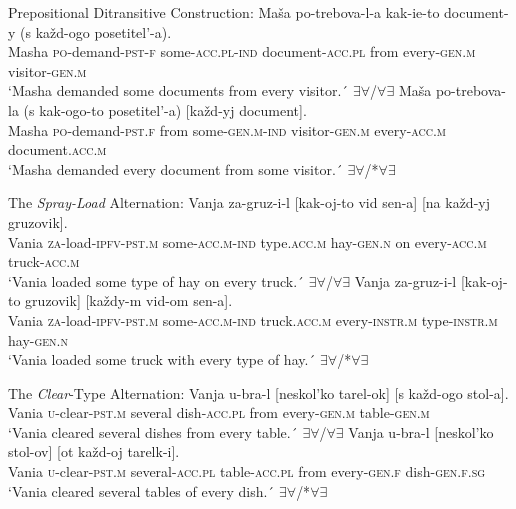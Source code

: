 \documentclass[output=paper,colorlinks,citecolor=brown,modfonts,nonflat]{langsci/langscibook}
\begin{document}
\ea%
    \label{ex:antonyuk:3}
    Prepositional Ditransitive Construction:
    \ea \label{ex:antonyuk:3a}
    \gll    Maša po-trebova-l-a	kak-ie-to document-y (s každ-ogo posetitel’-a).\\
            Masha \textsc{po-}demand\textsc{-pst-f} some\textsc{-acc.pl-ind} document\textsc{-acc.pl} from every\textsc{-gen.m} visitor\textsc{-gen.m}\\
    \glt    `Masha demanded some documents from every visitor.´ 
            \hfill ${\exists}{\forall}$/${\forall}{\exists}$
    \ex \label{ex:antonyuk:3b}
    \gll    Maša po-trebova-la (s kak-ogo-to posetitel’-a) [každ-yj	document].\\
            Masha \textsc{po-}demand\textsc{-pst.f} from some\textsc{-gen.m-ind} visitor\textsc{-gen.m} \hspaceThis{[}every\textsc{-acc.m} document\textsc{.acc.m}\\
    \glt    `Masha demanded every document from some visitor.´ 
            \hfill ${\exists}{\forall}$/*${\forall}{\exists}$
    \z
\z


\ea%
    \label{ex:antonyuk:4}
    The \textit{Spray-Load} Alternation:
    \ea \label{ex:antonyuk:4a}
    \gll    Vanja za-gruz-i-l [kak-oj-to vid sen-a] [na každ-yj gruzovik].\\
            Vania \textsc{za-}load\textsc{-ipfv-pst.m} \hspaceThis{[}some\textsc{-acc.m-ind} type\textsc{.acc.m} hay\textsc{-gen.n} \hspaceThis{[}on every\textsc{-acc.m} truck\textsc{-acc.m}\\
    \glt    `Vania loaded some type of hay on every truck.´ 
            \hfill ${\exists}{\forall}$/${\forall}{\exists}$
    \ex \label{ex:antonyuk:4b}
    \gll    Vanja za-gruz-i-l [kak-oj-to gruzovik] [každy-m	vid-om sen-a].\\
            Vania \textsc{za-}load\textsc{-ipfv-pst.m} \hspaceThis{[}some\textsc{-acc.m-ind} truck\textsc{.acc.m} \hspaceThis{[}every\textsc{-instr.m} type\textsc{-instr.m} hay\textsc{-gen.n}\\
    \glt    `Vania loaded some truck with every type of hay.´ 
            \hfill ${\exists}{\forall}$/*${\forall}{\exists}$
    \z
\z

\ea%
    \label{ex:antonyuk:5}
    The \textit{Clear}-Type Alternation:
    \ea \label{ex:antonyuk:5a}
    \gll    Vanja u-bra-l [neskol’ko tarel-ok] [s každ-ogo stol-a].\\
            Vania \textsc{u-}clear\textsc{-pst.m} \hspaceThis{[}several dish\textsc{-acc.pl} \hspaceThis{[}from every\textsc{-gen.m} table\textsc{-gen.m}\\
    \glt    `Vania cleared several dishes from every table.´ 
            \hfill ${\exists}{\forall}$/${\forall}{\exists}$
    \ex \label{ex:antonyuk:5b}
    \gll    Vanja u-bra-l [neskol’ko stol-ov] [ot každ-oj tarelk-i].\\
            Vania \textsc{u-}clear\textsc{-pst.m} \hspaceThis{[}several\textsc{-acc.pl} table\textsc{-acc.pl} \hspaceThis{[}from every\textsc{-gen.f} dish\textsc{-gen.f.sg}\\
    \glt    `Vania cleared several tables of every dish.´ 
            \hfill ${\exists}{\forall}$/*${\forall}{\exists}$
    \z
\z
\end{document}
